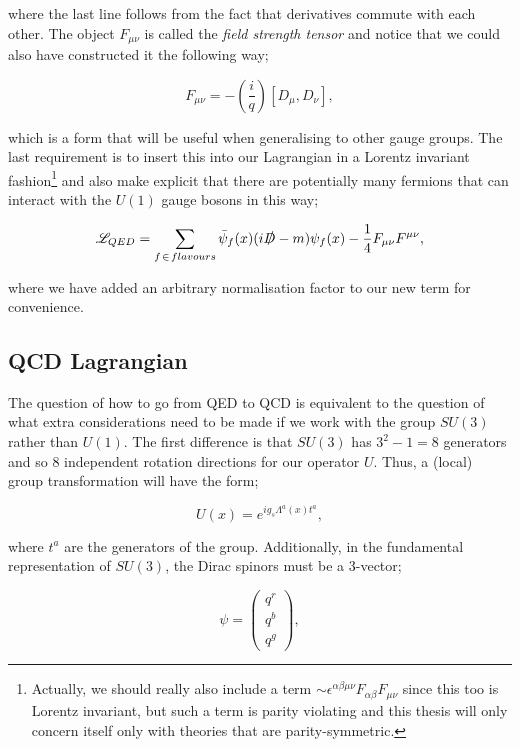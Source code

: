 where the last line follows from the fact that derivatives commute with each other. The object $F_{\mu \nu}$ is called the \emph{field strength tensor} and notice that we could also have constructed it the following way;

\begin{equation}
F_{\mu \nu} = -\left (\frac{i}{q} \right)[D_\mu, D_\nu],
\end{equation}

which is a form that will be useful when generalising to other gauge groups. The last requirement is to insert this into our Lagrangian in a Lorentz invariant fashion\footnote{Actually, we should really also include a term $\sim \epsilon^{\alpha \beta \mu \nu}F_{\alpha \beta} F_{\mu \nu}$ since this too is Lorentz invariant, but such a term is parity violating and this thesis will only concern itself only with theories that are parity-symmetric.} and also make explicit that there are potentially many fermions that can interact with the $U(1)$ gauge bosons in this way;

\begin{equation}
\mathscr{L}_{QED} = \sum_{f \hspace{1pt} \in \hspace{1pt} flavours} \bar{\psi}_f(x)(i \slashed{D} - m)\psi_f(x) - \frac{1}{4}F_{\mu \nu}F^{\mu \nu},
\end{equation}

where we have added an arbitrary normalisation factor to our new term for convenience. 

\subsection{QCD Lagrangian} 

The question of how to go from QED to QCD is equivalent to the question of what extra considerations need to be made if we work with the group $SU(3)$ rather than $U(1)$. The first difference is that $SU(3)$ has $3^2 - 1 = 8$ generators and so 8 independent rotation directions for our operator $U$. Thus, a (local) group transformation will have the form;

\begin{equation}
U(x) = e^{i g_s \Lambda^a(x)t^a},
\end{equation}

where $t^a$ are the generators of the group. Additionally, in the fundamental representation of $SU(3)$, the Dirac spinors must be a 3-vector;

\begin{equation}
\psi = \begin{pmatrix}
    q^r \\
    q^b \\
    q^g
\end{pmatrix} ,
\end{equation}

